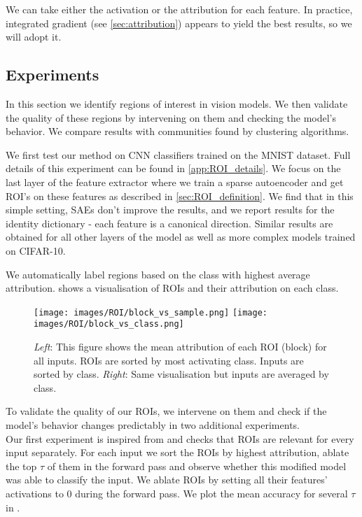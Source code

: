 \documentclass{article}
\begin{document}
We can take either the activation or the attribution for each feature. In practice, integrated gradient (see \cref{sec:attribution}) appears to yield the best results, so we will adopt it.

\subsection{Experiments}
\label{sec:ROI_exp}

In this section we identify regions of interest in vision models. We then validate the quality of these regions by intervening on them and checking the model's behavior. We compare results with communities found by clustering algorithms.

We first test our method on CNN classifiers trained on the MNIST dataset. Full details of this experiment can be found in \cref{app:ROI_details}. We focus on the last layer of the feature extractor where we train a sparse autoencoder and get ROI's on these features as described in \cref{sec:ROI_definition}. We find that in this simple setting, SAEs don't improve the results, and we report results for the identity dictionary - each feature is a canonical direction. Similar results are obtained for all other layers of the model as well as more complex models trained on CIFAR-10.

We automatically label regions based on the class with highest average attribution.  shows a visualisation of ROIs and their attribution on each class.

\begin{figure}[h]
    \centering
    \texttt{[image: images/ROI/block\_vs\_sample.png]}
    \hfill
    \texttt{[image: images/ROI/block\_vs\_class.png]}
    \caption{\textit{Left}: This figure shows the mean attribution of each ROI (block) for all inputs. ROIs are sorted by most activating class. Inputs are sorted by class. \textit{Right}: Same visualisation but inputs are averaged by class.}
    \label{fig:ROI_per_class}
\end{figure}

To validate the quality of our ROIs, we intervene on them and check if the model's behavior changes predictably in two additional experiments.\\

Our first experiment is inspired from \citet{lu2019checking} and checks that ROIs are relevant for every input separately. For each input we sort the ROIs by highest attribution, ablate the top $\tau$ of them in the forward pass and observe whether this modified model was able to classify the input. We ablate ROIs by setting all their features' activations to 0 during the forward pass. We plot the mean accuracy for several $\tau$ in .
\end{document}
